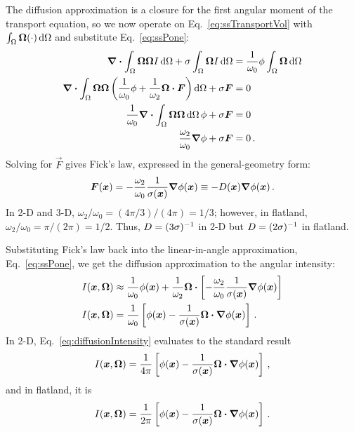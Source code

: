 The diffusion approximation is a closure for the first angular moment of
the transport equation, so we now operate on Eq.~\eqref{eq:ssTransportVol} with
$\int_\Omega \bm{\Omega} (\cdot) \mathop{}\!\mathrm{d} \Omega$ and substitute
Eq.~\eqref{eq:ssPone}:
\begin{align*}
  \bm{\nabla} \bm{\cdot} \int_\Omega \bm{\Omega} \bm{\Omega} I
  \mathop{}\!\mathrm{d}\Omega
  + \sigma \int_\Omega \bm{\Omega} I \mathop{}\!\mathrm{d}\Omega
  &= \frac{1}{\omega_0} \phi \int_\Omega \bm{\Omega} \mathop{}\!\mathrm{d}\Omega
  \\
  \bm{\nabla} \bm{\cdot} \int_\Omega \bm{\Omega} \bm{\Omega} \left(
  \frac{1}{\omega_0}\phi + \frac{1}{\omega_2} \bm{\Omega} \bm{\cdot} \bm{F}
  \right)
  \mathop{}\!\mathrm{d}\Omega
  + \sigma \bm{F}
  &= 0
  \\
  \frac{1}{\omega_0} \bm{\nabla} \bm{\cdot} \int_\Omega \bm{\Omega} \bm{\Omega}
  \mathop{}\!\mathrm{d}\Omega\, \phi 
  + \sigma \bm{F} &= 0
  \\
  \frac{\omega_2}{\omega_0} \bm{\nabla} \phi + \sigma \bm{F} &= 0 \,.
\end{align*}
Solving for $\vec{F}$ gives Fick's law, expressed in the general-geometry form:
\begin{equation} \label{eq:fickGeneral}
  \bm{F}(\bm{x})
  = - \frac{\omega_2}{\omega_0} \frac{1}{\sigma(\bm{x})} \bm{\nabla} \phi(\bm{x})
  \equiv -D(\bm{x}) \bm{\nabla} \phi(\bm{x})\,.
\end{equation}
In 2-D and 3-D, $\omega_2/\omega_0 = (4\pi / 3) / (4\pi) = 1/3$; however, in
flatland, $\omega_2/\omega_0 = \pi / (2\pi) = 1/2$. Thus, $D=(3\sigma)^{-1}$ in
2-D but $D=(2\sigma)^{-1}$ in flatland.

Substituting Fick's law back into the linear-in-angle approximation,
Eq.~\eqref{eq:ssPone}, we get the diffusion approximation to the angular
intensity:
\begin{align} \nonumber
  I(\bm{x}, \bm{\Omega})
  &\approx \frac{1}{\omega_0} \phi(\bm{x})
  + \frac{1}{\omega_2} \bm{\Omega} \bm{\cdot} \left[ - \frac{\omega_2}{\omega_0}
  \frac{1}{\sigma(\bm{x})} \bm{\nabla} \phi(\bm{x}) \right]
  \\ \label{eq:diffusionIntensity}
  I(\bm{x}, \bm{\Omega})
  &= \frac{1}{\omega_0} \left[ \phi(\bm{x})
  - \frac{1}{\sigma(\bm{x})}
  \bm{\Omega} \bm{\cdot} \bm{\nabla} \phi(\bm{x}) \right] \,.
\end{align}
In 2-D, Eq.~\eqref{eq:diffusionIntensity} evaluates to the standard result
\begin{equation*}
 I(\bm{x}, \bm{\Omega})
= \frac{1}{4\pi} \left[ \phi(\bm{x}) - \frac{1}{\sigma(\bm{x})} \bm{\Omega}
\bm{\cdot} \bm{\nabla} \phi(\bm{x}) \right] \,,
\end{equation*}
and in flatland, it is
\begin{equation}\label{eq:flatlandDiffusion}
 I(\bm{x}, \bm{\Omega})
= \frac{1}{2\pi} \left[ \phi(\bm{x}) - \frac{1}{\sigma(\bm{x})} \bm{\Omega}
\bm{\cdot} \bm{\nabla} \phi(\bm{x}) \right]\,.
\end{equation}

